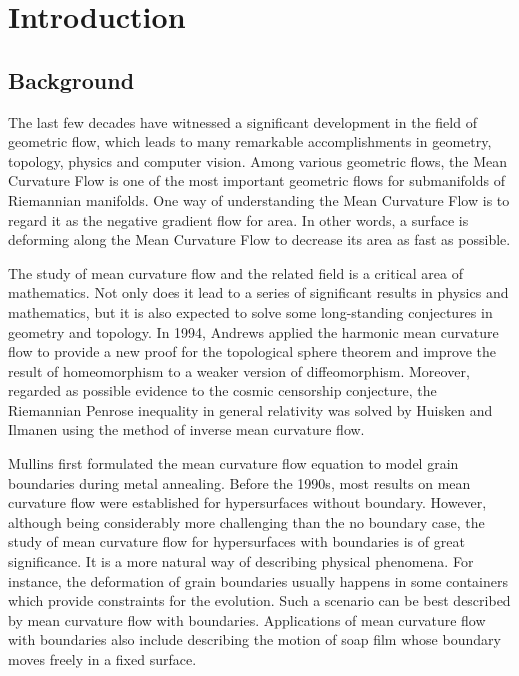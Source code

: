%

\chapter{Introduction}

\section{Background}

The last few decades have witnessed a significant development in the field of geometric flow, which leads to many remarkable accomplishments in geometry, topology, physics and computer vision. Among various geometric flows, the Mean Curvature Flow is one of the most important geometric flows for submanifolds of Riemannian manifolds. One way of understanding the Mean Curvature Flow is to regard it as the negative gradient flow for area. In other words, a surface is deforming along the Mean Curvature Flow to decrease its area as fast as possible.

The study of mean curvature flow and the related field is a critical area of mathematics. Not only does it lead to a series of significant results in physics and mathematics, but it is also expected to solve some long-standing conjectures in geometry and topology. In 1994, Andrews \cite{andrews_contraction_1994} applied the harmonic mean curvature flow to provide a new proof for the topological sphere theorem and improve the result of homeomorphism to a weaker version of diffeomorphism. Moreover, regarded as possible evidence to the cosmic censorship conjecture, the Riemannian Penrose inequality in general relativity was solved by Huisken and Ilmanen \cite{huisken_inverse_2001} using the method of inverse mean curvature flow.

Mullins \cite{mullins_twodimensional_1956} first formulated the mean curvature flow equation to model grain boundaries during metal annealing. Before the 1990s, most results on mean curvature flow were established for hypersurfaces without boundary. However, although being considerably more challenging than the no boundary case, the study of mean curvature flow for hypersurfaces with boundaries is of great significance. It is a more natural way of describing physical phenomena. For instance, the deformation of grain boundaries usually happens in some containers which provide constraints for the evolution. Such a scenario can be best described by mean curvature flow with boundaries. Applications of mean curvature flow with boundaries also include describing the motion of soap film whose boundary moves freely in a fixed surface.

